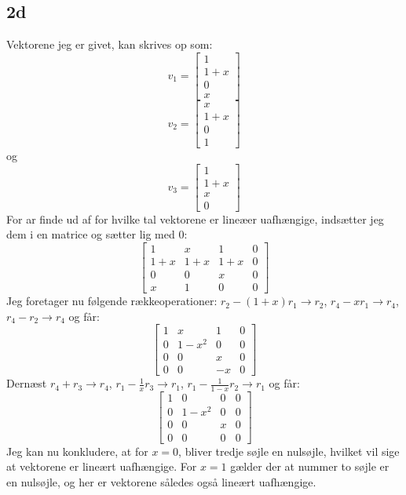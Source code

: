 \documentclass{article}
\begin{document}
\subsection*{2d}
Vektorene jeg er givet, kan skrives op som:
$$
v_1=\left[\begin{array}{c}
1 \\
1+x \\
0 \\
x
\end{array}\right]
$$
$$
v_2=\left[\begin{array}{c}
x \\
1+x \\
0 \\
1
\end{array}\right]
$$
og 
$$
v_3=\left[\begin{array}{c}
1 \\
1+x \\
x \\
0
\end{array}\right]
$$
For ar finde ud af for hvilke tal vektorene er lineæer uafhængige, indsætter jeg dem i en matrice og sætter lig med 0:
$$
\left[\begin{array}{ccc|c}
1 & x & 1 & 0 \\
1+x & 1+x & 1+x & 0 \\
0 & 0 & x & 0 \\
x & 1 & 0 & 0
\end{array}\right]
$$
Jeg foretager nu følgende rækkeoperationer: $r_2-(1+x) r_1 \rightarrow r_2$, $r_4-x r_1 \rightarrow r_4$, $r_4-r_2 \rightarrow r_4$ og får:
$$
\left[\begin{array}{ccc|c}
1 & x & 1 & 0 \\
0 & 1-x^2 & 0 & 0 \\
0 & 0 & x & 0 \\
0 & 0 & -x & 0
\end{array}\right]
$$
Dernæst $r_4+r_3 \rightarrow r_4$, $r_1-\frac{1}{x} r_3 \rightarrow r_1$, $r_1-\frac{1}{1-x} r_2 \rightarrow r_1$ og får:
$$
\left[\begin{array}{ccc|c}
1 & 0 & 0 & 0 \\
0 & 1-x^2 & 0 & 0 \\
0 & 0 & x & 0 \\
0 & 0 & 0 & 0
\end{array}\right]
$$
Jeg kan nu konkludere, at for $x=0$, bliver tredje søjle en nulsøjle, hvilket vil sige at vektorene er lineært uafhængige. For $x=1$ gælder der at nummer to søjle er en nulsøjle, og her er vektorene således også lineært uafhængige. 
\end{document}

